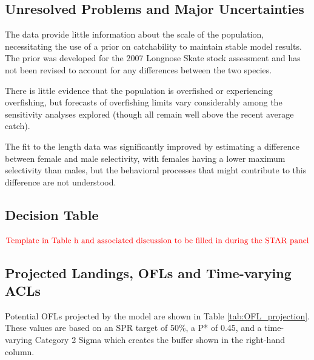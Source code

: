 \documentclass[12pt,]{article}
\begin{document}
\FloatBarrier

\hypertarget{unresolved-problems-and-major-uncertainties}{%
\subsection*{Unresolved Problems and Major
Uncertainties}\label{unresolved-problems-and-major-uncertainties}}

The data provide little information about the scale of the population,
necessitating the use of a prior on catchability to maintain stable
model results. The prior was developed for the 2007 Longnose Skate stock
assessment and has not been revised to account for any differences
between the two species.

There is little evidence that the population is overfished or
experiencing overfishing, but forecasts of overfishing limits vary
considerably among the sensitivity analyses explored (though all remain
well above the recent average catch).

The fit to the length data was significantly improved by estimating a
difference between female and male selectivity, with females having a
lower maximum selectivity than males, but the behavioral processes that
might contribute to this difference are not understood.

\FloatBarrier

\hypertarget{decision-table}{%
\subsection*{Decision Table}\label{decision-table}}

\textbf{\(\color{red}{\text{Template in Table h and associated discussion to be filled in during the STAR panel}}\)}

\FloatBarrier

\hypertarget{projected-landings-ofls-and-time-varying-acls}{%
\subsection*{Projected Landings, OFLs and Time-varying
ACLs}\label{projected-landings-ofls-and-time-varying-acls}}

Potential OFLs projected by the model are shown in Table
\ref{tab:OFL_projection}. These values are based on an SPR target of
50\%, a P* of 0.45, and a time-varying Category 2 Sigma which creates
the buffer shown in the right-hand column.
\end{document}

